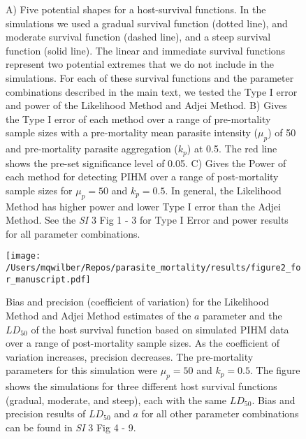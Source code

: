 \documentclass[12pt, a4paper]{article}
\begin{document}
\begin{figure}


\caption{A) Five potential shapes for a host-survival functions. In the simulations we used a gradual survival function (dotted line), and moderate survival function (dashed line), and a steep survival function (solid line). The linear and immediate survival functions represent two potential extremes that we do not include in the simulations. For each of these survival functions and the parameter combinations described in the main text, we tested the Type I error and power of the Likelihood Method and Adjei Method. B) Gives the Type I error of each method over a range of pre-mortality sample sizes with a pre-mortality mean parasite intensity ($\mu_p$) of 50 and pre-mortality parasite aggregation ($k_p$) at 0.5. The red line shows the pre-set significance level of 0.05. C) Gives the Power of each method for detecting PIHM over a range of post-mortality sample sizes for $\mu_p = 50$ and $k_p = 0.5$.  In general, the Likelihood Method has higher power and lower Type I error than the Adjei Method.  See the \emph{SI} 3 Fig 1 - 3 for Type I Error and power results for all parameter combinations.}

\label{fig:question1}

\end{figure}

\begin{figure}
    \texttt{[image: /Users/mqwilber/Repos/parasite\_mortality/results/figure2\_for\_manuscript.pdf]}

    \caption{Bias and precision (coefficient of variation) for the Likelihood Method and Adjei Method estimates of the $a$ parameter and the $LD_{50}$ of the host survival function based on simulated PIHM data over a range of post-mortality sample sizes.  As the coefficient of variation increases, precision decreases. The pre-mortality parameters for this simulation were $\mu_p = 50$ and $k_p = 0.5$.  The figure shows the simulations for three different host survival functions (gradual, moderate, and steep), each with the same $LD_{50}$.  Bias and precision results of $LD_{50}$ and $a$ for all other parameter combinations can be found in \emph{SI} 3 Fig 4 - 9.}

    \label{fig:question2}

\end{figure}
\end{document}
